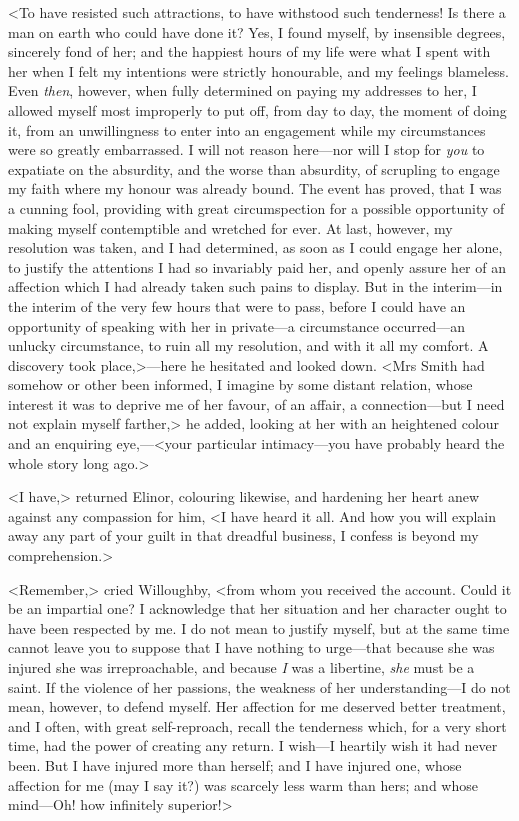 <To have resisted such attractions, to have withstood such tenderness! Is there a man on earth who could have done it? Yes, I found myself, by insensible degrees, sincerely fond of her; and the happiest hours of my life were what I spent with her when I felt my intentions were strictly honourable, and my feelings blameless. Even \textit{then}, however, when fully determined on paying my addresses to her, I allowed myself most improperly to put off, from day to day, the moment of doing it, from an unwillingness to enter into an engagement while my circumstances were so greatly embarrassed. I will not reason here—nor will I stop for \textit{you} to expatiate on the absurdity, and the worse than absurdity, of scrupling to engage my faith where my honour was already bound. The event has proved, that I was a cunning fool, providing with great circumspection for a possible opportunity of making myself contemptible and wretched for ever. At last, however, my resolution was taken, and I had determined, as soon as I could engage her alone, to justify the attentions I had so invariably paid her, and openly assure her of an affection which I had already taken such pains to display. But in the interim—in the interim of the very few hours that were to pass, before I could have an opportunity of speaking with her in private—a circumstance occurred—an unlucky circumstance, to ruin all my resolution, and with it all my comfort. A discovery took place,>—here he hesitated and looked down. <Mrs Smith had somehow or other been informed, I imagine by some distant relation, whose interest it was to deprive me of her favour, of an affair, a connection—but I need not explain myself farther,> he added, looking at her with an heightened colour and an enquiring eye,—<your particular intimacy—you have probably heard the whole story long ago.>

<I have,> returned Elinor, colouring likewise, and hardening her heart anew against any compassion for him, <I have heard it all. And how you will explain away any part of your guilt in that dreadful business, I confess is beyond my comprehension.>

<Remember,> cried Willoughby, <from whom you received the account. Could it be an impartial one? I acknowledge that her situation and her character ought to have been respected by me. I do not mean to justify myself, but at the same time cannot leave you to suppose that I have nothing to urge—that because she was injured she was irreproachable, and because \textit{I} was a libertine, \textit{she} must be a saint. If the violence of her passions, the weakness of her understanding—I do not mean, however, to defend myself. Her affection for me deserved better treatment, and I often, with great self-reproach, recall the tenderness which, for a very short time, had the power of creating any return. I wish—I heartily wish it had never been. But I have injured more than herself; and I have injured one, whose affection for me (may I say it?) was scarcely less warm than hers; and whose mind—Oh! how infinitely superior!>

